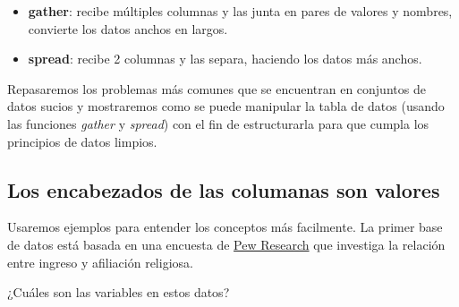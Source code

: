 \documentclass[
]{book}
\providecommand{\tightlist}{%
  \setlength{\itemsep}{0pt}\setlength{\parskip}{0pt}}
\begin{document}
\begin{itemize}
\tightlist
\item
  \textbf{gather}: recibe múltiples columnas y las junta en pares de valores y
  nombres, convierte los datos anchos en largos.\\
\item
  \textbf{spread}: recibe 2 columnas y las separa, haciendo los datos más anchos.
\end{itemize}

Repasaremos los problemas más comunes que se encuentran en conjuntos de datos
sucios y mostraremos como se puede manipular la tabla de datos (usando las
funciones \emph{gather} y \emph{spread}) con el fin de estructurarla para que cumpla los
principios de datos limpios.

\hypertarget{los-encabezados-de-las-columanas-son-valores}{%
\subsection*{Los encabezados de las columanas son valores}\label{los-encabezados-de-las-columanas-son-valores}}

Usaremos ejemplos para entender los conceptos más facilmente.
La primer base de datos está basada en una encuesta de \href{http://www.pewforum.org/2009/01/30/income-distribution-within-us-religious-groups/}{Pew Research} que
investiga la relación entre ingreso y afiliación religiosa.

¿Cuáles son las variables en estos datos?
\end{document}
